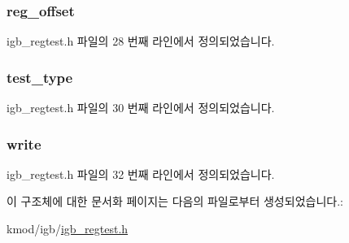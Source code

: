 \subsubsection[{\texorpdfstring{reg\+\_\+offset}{reg_offset}}]{ reg\+\_\+offset}\hypertarget{structigb__reg__test_a05b8f7352796e6752e9136077c31dd96}{}\label{structigb__reg__test_a05b8f7352796e6752e9136077c31dd96}


igb\+\_\+regtest.\+h 파일의 28 번째 라인에서 정의되었습니다.

\subsubsection[{\texorpdfstring{test\+\_\+type}{test_type}}]{ test\+\_\+type}\hypertarget{structigb__reg__test_a803e2ff6da1ec42a5c83aab18644fbff}{}\label{structigb__reg__test_a803e2ff6da1ec42a5c83aab18644fbff}


igb\+\_\+regtest.\+h 파일의 30 번째 라인에서 정의되었습니다.

\subsubsection[{\texorpdfstring{write}{write}}]{ write}\hypertarget{structigb__reg__test_a03c506d38835bd26a79d9a0d012c4d8b}{}\label{structigb__reg__test_a03c506d38835bd26a79d9a0d012c4d8b}


igb\+\_\+regtest.\+h 파일의 32 번째 라인에서 정의되었습니다.



이 구조체에 대한 문서화 페이지는 다음의 파일로부터 생성되었습니다.\+:\begin{DoxyCompactItemize}
\item 
kmod/igb/\hyperlink{igb__regtest_8h}{igb\+\_\+regtest.\+h}\end{DoxyCompactItemize}
